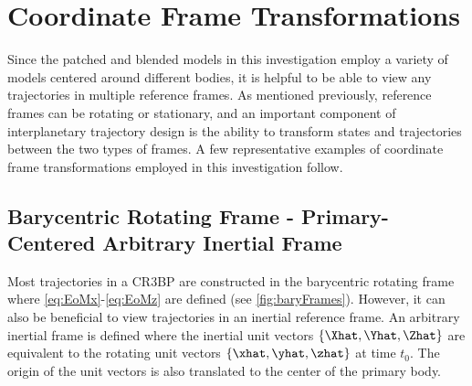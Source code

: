\section{Coordinate Frame Transformations}\label{sec:FrameTransformations}
Since the patched and blended models in this investigation employ a variety of models centered
around different bodies, it is helpful to be able to view any trajectories in multiple reference
frames. As mentioned previously, reference frames can be rotating or stationary, and an important
component of interplanetary trajectory design is the ability to transform states and trajectories
between the two types of frames. A few representative examples of coordinate frame transformations
employed in this investigation follow.

\subsection{Barycentric Rotating Frame - Primary-Centered Arbitrary Inertial Frame}
Most trajectories in a CR3BP are constructed in the barycentric rotating frame where
\cref{eq:EoMx}-\cref{eq:EoMz} are defined (see \cref{fig:baryFrames}). However, it can also be
beneficial to view trajectories in an inertial reference frame. An arbitrary inertial frame is
defined where the inertial unit vectors $\{\Xhat,\Yhat,\Zhat\}$ are equivalent to the rotating unit
vectors $\{\xhat,\yhat,\zhat\}$ at time $t_{0}$. The origin of the unit vectors is also translated
to the center of the primary body.

